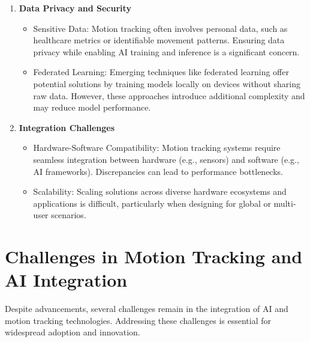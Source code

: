 \begin{enumerate}
    \item \textbf{Data Privacy and Security}
        \begin{itemize}
            \item Sensitive Data: Motion tracking often involves personal data, such as healthcare metrics or identifiable movement patterns. Ensuring data privacy while enabling AI training and inference is a significant concern.
            \item Federated Learning: Emerging techniques like federated learning offer potential solutions by training models locally on devices without sharing raw data. However, these approaches introduce additional complexity and may reduce model performance.
        \end{itemize}

    \item \textbf{Integration Challenges}
        \begin{itemize}
            \item Hardware-Software Compatibility: Motion tracking systems require seamless integration between hardware (e.g., sensors) and software (e.g., AI frameworks). Discrepancies can lead to performance bottlenecks.
            \item Scalability: Scaling solutions across diverse hardware ecosystems and applications is difficult, particularly when designing for global or multi-user scenarios.
        \end{itemize}

\end{enumerate}

\section{Challenges in Motion Tracking and AI Integration}

Despite advancements, several challenges remain in the integration of AI and motion tracking technologies. Addressing these challenges is essential for widespread adoption and innovation.

